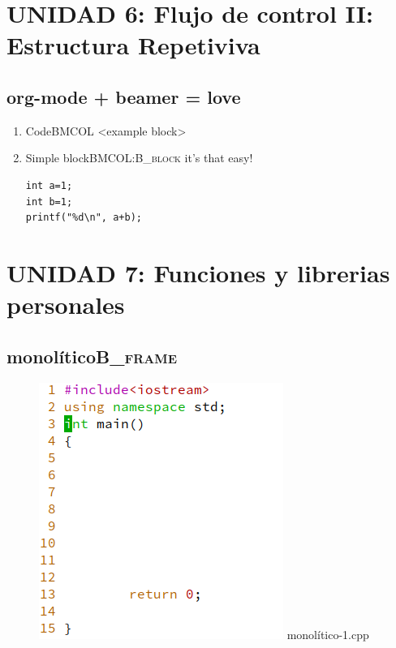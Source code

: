 \documentclass[presentation, aspectratio=54]{beamer}
\begin{document}
\begin{enumerate}
\begin{center}
\end{center}
\end{enumerate}


\section{UNIDAD 6: Flujo de control II: Estructura Repetiviva}
\label{sec:org103e5f4}
\subsection{org-mode + beamer =  love}
\label{sec:org14b98cf}
\begin{enumerate}
\item Code\hfill{}\textsc{BMCOL}
\label{sec:orgc632657}
<example block>
\item Simple block\hfill{}\textsc{BMCOL:B\_block}
\label{sec:orge539c50}
it's that easy!
\begin{verbatim}
int a=1;
int b=1;
printf("%d\n", a+b);
\end{verbatim}
\end{enumerate}







\section{UNIDAD 7: Funciones y librerias personales}
\label{sec:org1398a01}
\subsection{monolítico\hfill{}\textsc{B\_frame}}
\label{sec:org24845d6}
\begin{figure}[htbp]
\centering
\includegraphics[width=0.5\linewidth]{./images/codigo/monolitico-1.png}
monolítico-1.cpp
\end{figure}
\end{document}
